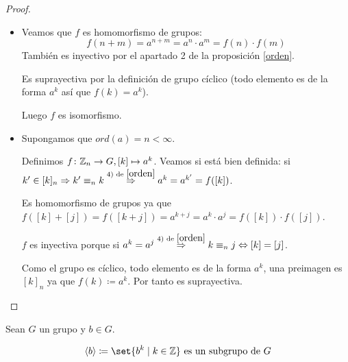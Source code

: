 \begin{proof}
	\begin{itemize}
		\item Veamos que \(f \) es homomorfismo de grupos:
		      \[
			      f(n + m) = a^{n + m} = a^{n} \cdot a^{m} = f(n) \cdot f(m)
		      \]
		      También es inyectivo por el apartado 2 de la proposición \ref{orden}.
		      
		      Es suprayectiva por la definición de grupo cíclico (todo elemento es de la forma \(a^{k } \) así que \(f(k) = a^{k} \)).
		      
		      Luego \(f \) es isomorfismo.
		\item Supongamos que \(ord(a) = n < \infty \).
		      
		      Definimos \(f \colon \Z_n \rightarrow G, [k] \mapsto a^{k} \). Veamos si está bien definida: si \(k^\prime \in [k]_n \Rightarrow k^\prime \equiv_n k \overset{\text{4) de }  \ref{orden}}{\Rightarrow} a^{k} = a^{k^\prime } = f([k])   \).
		      
		      Es homomorfismo de grupos ya que \(f([k] + [j]) = f([k + j]) = a^{k + j} = a^{k} \cdot a^{j} = f([k]) \cdot f([j])   \).
		      
		      \(f \) es inyectiva porque si \(a^{k} = a^{j } \overset{\text{4) de } \ref{orden}}{\Rightarrow} k \equiv_n j \iff [k] = [j] \).
		      
		      Como el grupo es cíclico, todo elemento es de la forma \(a^{k } \), una preimagen es \([k]_n \) ya que \(f(k) \coloneqq  a^{k} \). Por tanto es suprayectiva.
	\end{itemize}
\end{proof}
\begin{proposition}
	Sean \(G \) un grupo y \(b \in G \).
	
	\[
		\langle b \rangle \coloneqq \set{b^{k} \mid k \in \Z } \text{ es un subgrupo de }G
	\]
\end{proposition}

